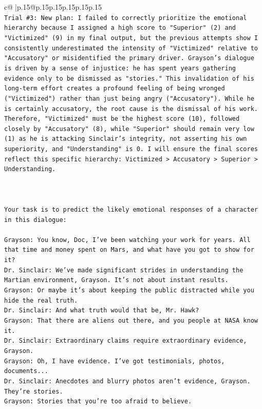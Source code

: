 \documentclass{article}
\begin{document}
{\begin{supertabular}{c@{$\;$}|p{.15\linewidth}@{}p{.15\linewidth}p{.15\linewidth}p{.15\linewidth}p{.15\linewidth}p{.15\linewidth}}
{{{\\ 
\texttt{Trial \#3: New plan: I failed to correctly prioritize the emotional hierarchy because I assigned a high score to "Superior" (2) and "Victimized" (9) in my final output, but the previous attempts show I consistently underestimated the intensity of "Victimized" relative to "Accusatory" or misidentified the primary driver. Grayson's dialogue is driven by a sense of injustice: he has spent years gathering evidence only to be dismissed as "stories." This invalidation of his long{-}term effort creates a profound feeling of being wronged ("Victimized") rather than just being angry ("Accusatory"). While he is certainly accusatory, the root cause is the dismissal of his work. Therefore, "Victimized" must be the highest score (10), followed closely by "Accusatory" (8), while "Superior" should remain very low (1) as he is attacking Sinclair's integrity, not asserting his own superiority, and "Understanding" is 0. I will ensure the final scores reflect this specific hierarchy: Victimized > Accusatory > Superior > Understanding.} \\
\\ 
\\ 
\\ 
\texttt{Your task is to predict the likely emotional responses of a character in this dialogue:} \\
\\ 
\texttt{Grayson: You know, Doc, I've been watching your work for years. All that time and money spent on Mars, and what have you got to show for it? } \\
\texttt{Dr. Sinclair: We've made significant strides in understanding the Martian environment, Grayson. It's not about instant results. } \\
\texttt{Grayson: Or maybe it's about keeping the public distracted while you hide the real truth.} \\
\texttt{Dr. Sinclair: And what truth would that be, Mr. Hawk?} \\
\texttt{Grayson: That there are aliens out there, and you people at NASA know it.} \\
\texttt{Dr. Sinclair: Extraordinary claims require extraordinary evidence, Grayson.} \\
\texttt{Grayson: Oh, I have evidence. I've got testimonials, photos, documents...} \\
\texttt{Dr. Sinclair: Anecdotes and blurry photos aren't evidence, Grayson. They're stories. } \\
\texttt{Grayson: Stories that you're too afraid to believe.} \\
}}}
\end{supertabular}}
\end{document}
